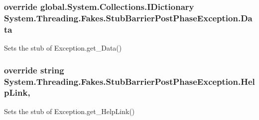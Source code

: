 \hypertarget{class_system_1_1_threading_1_1_fakes_1_1_stub_barrier_post_phase_exception_a045a6bf0d854f409be79df98be94d1aa}{
\subsubsection[{Data}]{\setlength{\rightskip}{0pt plus 5cm}override global.\-System.\-Collections.\-I\-Dictionary System.\-Threading.\-Fakes.\-Stub\-Barrier\-Post\-Phase\-Exception.\-Data\hspace{0.3cm}{\ttfamily [get]}}}\label{class_system_1_1_threading_1_1_fakes_1_1_stub_barrier_post_phase_exception_a045a6bf0d854f409be79df98be94d1aa}


Sets the stub of Exception.\-get\-\_\-\-Data()

\hypertarget{class_system_1_1_threading_1_1_fakes_1_1_stub_barrier_post_phase_exception_abbc0c1926b5e21f4f0a8019e2f622dd7}{
\subsubsection[{Help\-Link}]{\setlength{\rightskip}{0pt plus 5cm}override string System.\-Threading.\-Fakes.\-Stub\-Barrier\-Post\-Phase\-Exception.\-Help\-Link\hspace{0.3cm}{\ttfamily [get]}, {\ttfamily [set]}}}\label{class_system_1_1_threading_1_1_fakes_1_1_stub_barrier_post_phase_exception_abbc0c1926b5e21f4f0a8019e2f622dd7}


Sets the stub of Exception.\-get\-\_\-\-Help\-Link()

